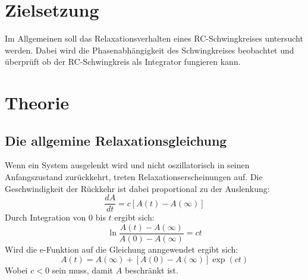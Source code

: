 \section{Zielsetzung}
Im Allgemeinen soll das Relaxationsverhalten eines RC-Schwingkreises untersucht werden.
Dabei wird die Phasenabhängigkeit des Schwingkreises beobachtet und überprüft ob der RC-Schwingkreis als Integrator fungieren kann.

\section{Theorie}
\label{sec:Theorie}
\subsection{Die allgemine Relaxationsgleichung}
Wenn ein System ausgelenkt wird und nicht oszillatorisch in seinen Anfangszustand zurückkehrt, treten Relaxationserscheinungen auf.
Die Geschwindigkeit der Rückkehr ist dabei proportional zu der Auslenkung:
\begin{equation}
  \frac{dA}{dt}=c[A(t)-A(\infty)]
\end{equation}
Durch Integration von $0$ bis $t$ ergibt sich:
\begin{equation}
  \ln{\frac{A(t)-A(\infty)}{A(0)-A(\infty)}}=ct
\end{equation}
Wird die e-Funktion auf die Gleichung anngewendet ergibt sich:
\begin{equation}
  \label{eq:gl2}
  A(t)=A(\infty)+[A(0)-A(\infty)]\exp(ct)
\end{equation}
Wobei $c<0$ sein muss, damit $A$ beschränkt ist.
